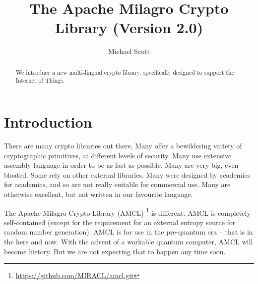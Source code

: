 \documentclass{llncs}
\begin{document}
\pagestyle{plain}

\title{The Apache Milagro Crypto Library (Version 2.0)}

\author{
Michael Scott 
}

\institute{}


\maketitle

\begin{abstract}

We introduce a new multi-lingual crypto library, specifically designed to support the Internet of Things.

\end{abstract} 

\section{Introduction}\label{sec:intro}


There are many crypto libraries out there. Many offer a bewildering variety of cryptographic primitives, at different levels of security. Many use extensive assembly language 
in order to be as fast as possible. Many are very big, even bloated. Some rely on other external libraries. Many were designed by academics for academics, and so are not really suitable for 
commercial use. Many are otherwise excellent, but not written in our favourite language.

The Apache Milagro Crypto Library (AMCL) \footnote{\url{https://github.com/MIRACL/amcl.git}} is different. AMCL is completely self-contained (except for the requirement for an external entropy source for random number generation). 
AMCL is for use in the pre-quantum era -- that is in the here and now. With 
the advent of a workable quantum computer, AMCL will become history. But we are not expecting that to happen any time soon.
\end{document}
